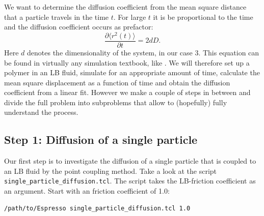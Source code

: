 We want to determine the diffusion coefficient from the mean square
distance that a particle travels in the time $t$. For large $t$ it is
be proportional to the time and the diffusion coefficient occurs as 
prefactor: 
\begin{equation}
  \frac{\partial \langle r^2 \left(t\right)\rangle}{\partial t} = 2 d D. 
  \label{eq:msd}
\end{equation}
Here $d$ denotes the dimensionality of the system, in our case 3.
This equation can be found in virtually any simulation textbook, like
\cite{frenkel02b}.
We will therefore set up a polymer in an LB fluid, simulate for an appropriate
amount of time, calculate the mean square displacement as a function of
time and obtain the diffusion coefficient from a linear fit. However
we make a couple of steps in between and divide the full problem into 
subproblems that allow to (hopefully) fully understand the process.

\subsection{Step 1: Diffusion of a single particle}
Our first step is to investigate the diffusion of a single particle
that is coupled to an LB fluid by the point coupling method.
Take a look at the script {\tt single\_particle\_diffusion.tcl}.
The script takes the LB-friction coefficient as an argument. Start with
an friction coefficient of 1.0:
{\vspace{0,2cm}\small
\begin{lstlisting}[numbers=none]
/path/to/Espresso single_particle_diffusion.tcl 1.0
\end{lstlisting}
\vspace{0,2cm}
}

